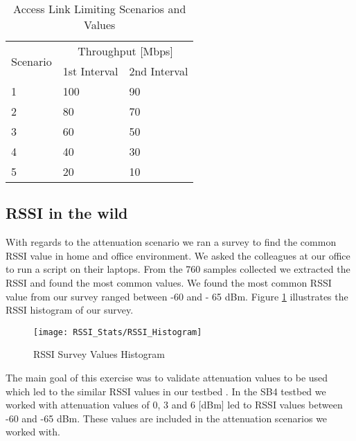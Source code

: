 \begin{table}[h!]
	\begin{center}
		\begin{tabular}{|| m{5em} | m{2cm}| m{2cm} ||}
			\hline
			\multirow{2}{*}{Scenario} & \multicolumn{2}{c||}{Throughput {[}Mbps{]}} \\ \cline{2-3} 
			& \multicolumn{1}{l|}{1st Interval} & \multicolumn{1}{l||}{2nd Interval} \\ \hline\hline
			1 & 100 & 90 \\ \hline
			2 & 80 & 70 \\ \hline
			3 & 60 & 50 \\ \hline
			4 & 40 & 30 \\ \hline
			5 & 20 & 10 \\ \hline
		\end{tabular}
	\end{center}
	\caption{Access Link Limiting Scenarios and Values}
	\label{table:Access_Link_Experiment_Values}
\end{table}

\subsection{RSSI in the wild}

With regards to the attenuation scenario we ran a survey to find the common RSSI value in home and office environment. We asked the colleagues at our office to run a script on their laptops. From the 760 samples collected we extracted the RSSI and found the most common values. We found the most common RSSI value from our survey ranged between -60 and - 65 dBm. Figure \ref{fig:RSSI_Histogram} illustrates the RSSI histogram of our survey.

\begin{figure}[h]
	\centering
	\texttt{[image: RSSI\_Stats/RSSI\_Histogram]}
	\caption{RSSI Survey Values Histogram}
	\label{fig:RSSI_Histogram}
\end{figure}

The main goal of this exercise was to validate attenuation values to be used which led to the similar RSSI values in our testbed . In the SB4 testbed we worked with attenuation values of 0, 3 and 6 [dBm] led to RSSI values between -60 and -65 dBm. These values are included in the attenuation scenarios we worked with.



